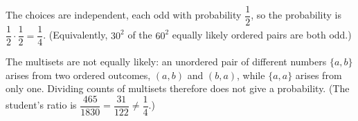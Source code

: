 The choices are independent, each odd with probability $\dfrac12$, so the probability is $\dfrac12\cdot\dfrac12=\boxed{\dfrac14}$. (Equivalently, $30^2$ of the $60^2$ equally likely ordered pairs are both odd.)

The multisets are not equally likely: an unordered pair of different numbers $\{a,b\}$ arises from two ordered outcomes, $(a,b)$ and $(b,a)$, while $\{a,a\}$ arises from only one. Dividing counts of multisets therefore does not give a probability. (The student's ratio is $\dfrac{465}{1830}=\dfrac{31}{122}\ne\dfrac14$.)
